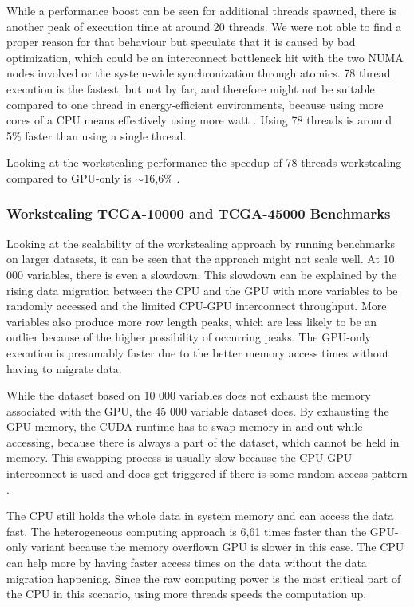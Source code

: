 While a performance boost can be seen for additional threads spawned, there is another peak of execution time at around 20 threads. We were not able to find a proper reason for that behaviour but speculate that it is caused by bad optimization, which could be an interconnect bottleneck hit with the two NUMA nodes involved or the system-wide synchronization through atomics. 78 thread execution is the fastest, but not by far, and therefore might not be suitable compared to one thread in energy-efficient environments, because using more cores of a CPU means effectively using more watt \cite{saravananStudyFactorsInfluencing2011}. Using 78 threads is around 5\% faster than using a single thread.

Looking at the workstealing performance the speedup of 78 threads workstealing compared to GPU-only is $\sim$16,6\% .

\subsubsection{Workstealing TCGA-10000 and TCGA-45000 Benchmarks}


Looking at the scalability of the workstealing approach by running benchmarks on larger datasets, it can  be seen that the approach might not scale well. At 10 000 variables, there is even a slowdown. This slowdown can be explained by the rising data migration between the CPU and the GPU with more variables to be randomly accessed and the limited CPU-GPU interconnect throughput. More variables also produce more row length peaks, which are less likely to be an outlier because of the higher possibility of occurring peaks.
The GPU-only execution is presumably faster due to the better memory access times without having to migrate data.

While the dataset based on 10 000 variables does not exhaust the memory associated with the GPU, the 45 000 variable dataset does. By exhausting the GPU memory, the CUDA runtime has to swap memory in and out while accessing, because there is always a part of the dataset, which cannot be held in memory. This swapping process is usually slow because the CPU-GPU interconnect is used and does get triggered if there is some random access pattern \cite{gangulyAdaptivePageMigration2020, kimBatchAwareUnifiedMemory}.

The CPU still holds the whole data in system memory and can access the data fast. The heterogeneous computing approach is 6,61 times faster than the GPU-only variant because the memory overflown GPU is slower in this case. The CPU can help more by having faster access times on the data without the data migration happening.
Since the raw computing power is the most critical part of the CPU in this scenario, using more threads speeds the computation up.

